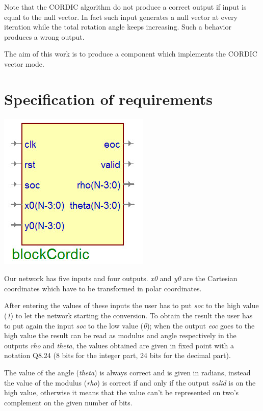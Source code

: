 \documentclass[12pt,a4paper]{report}
\begin{document}
Note that the CORDIC algorithm do not produce a correct output if input is equal to the null vector. In fact such input generates a null vector at every iteration while the total rotation angle keeps increasing. Such a behavior produces a wrong output.
 

The aim of this work is to produce a component which implements the CORDIC vector mode.

\section{Specification of requirements}

\begin{center}
\includegraphics[scale=.50]{img/cd.jpg}\\
\end{center}
Our network has five inputs and four outputs. \emph{x0} and \emph{y0} are the Cartesian coordinates which have to be transformed in polar coordinates. 

After entering the values of these inputs the user has to put \emph{soc} to the high value (\emph{1}) to let the network starting the conversion. To obtain the result the user has to put again the input \emph{soc} to the low value (\emph{0}); when the output \emph{eoc} goes to the high value the result can be read as modulus and angle respectively in the outputs \emph{rho} and \emph{theta}, the values obtained are given in fixed point with a notation Q8.24 (8 bits for the integer part, 24 bits for the decimal part). 

The value of the angle (\emph{theta}) is always correct and is given in radians, instead the value of the modulus (\emph{rho}) is correct if and  only if the output \emph{valid} is on the high value, otherwise it means that the value can't be represented on two's complement on the given number of bits. 
\end{document}
